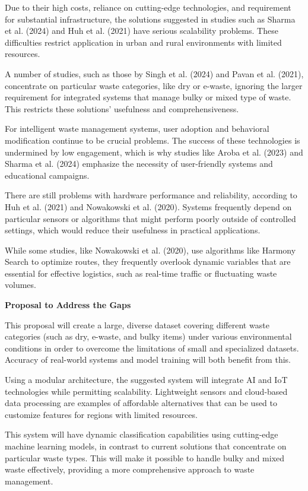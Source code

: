 Due to their high costs, reliance on cutting-edge technologies, and requirement for substantial infrastructure, the solutions suggested in studies such as Sharma et al. (2024) and Huh et al. (2021) have serious scalability problems. These difficulties restrict application in urban and rural environments with limited resources.

A number of studies, such as those by Singh et al. (2024) and Pavan et al. (2021), concentrate on particular waste categories, like dry or e-waste, ignoring the larger requirement for integrated systems that manage bulky or mixed type of waste. This restricts these solutions' usefulness and comprehensiveness.

For intelligent waste management systems, user adoption and behavioral modification continue to be crucial problems. The success of these technologies is undermined by low engagement, which is why studies like Aroba et al. (2023) and Sharma et al. (2024) emphasize the necessity of user-friendly systems and educational campaigns.

There are still problems with hardware performance and reliability, according to Huh et al. (2021) and Nowakowski et al. (2020). Systems frequently depend on particular sensors or algorithms that might perform poorly outside of controlled settings, which would reduce their usefulness in practical applications.

While some studies, like Nowakowski et al. (2020), use algorithms like Harmony Search to optimize routes, they frequently overlook dynamic variables that are essential for effective logistics, such as real-time traffic or fluctuating waste volumes. \newline 

\noindent \textbf{Proposal to Address the Gaps}

This proposal will create a large, diverse dataset covering different waste categories (such as dry, e-waste, and bulky items) under various environmental conditions in order to overcome the limitations of small and specialized datasets. Accuracy of real-world systems and model training will both benefit from this.

Using a modular architecture, the suggested system will integrate AI and IoT technologies while permitting scalability. Lightweight sensors and cloud-based data processing are examples of affordable alternatives that can be used to customize features for regions with limited resources.

This system will have dynamic classification capabilities using cutting-edge machine learning models, in contrast to current solutions that concentrate on particular waste types. This will make it possible to handle bulky and mixed waste effectively, providing a more comprehensive approach to waste management.


